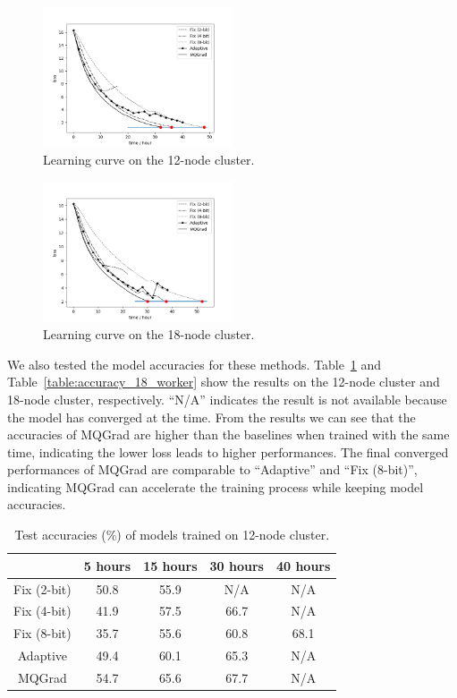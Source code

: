 \documentclass[sigconf]{acmart}
\begin{document}
\begin{figure}[t]
	\includegraphics[width=0.5\textwidth]{figure/loss_12.png}
	\caption{Learning curve on the 12-node cluster.}\label{fig:12_worker}
\end{figure}
\begin{figure}[t]
	\includegraphics[width=0.5\textwidth]{figure/loss_18.png}
	\caption{Learning curve on the 18-node cluster.}\label{fig:18_worker}
\end{figure}

We also tested the model accuracies for these methods. Table~\ref{table:accuracy_12_worker} and Table~\ref{table:accuracy_18_worker} show the results on the 12-node cluster and 18-node cluster, respectively. ``N/A'' indicates the result is not available because the model has converged at the time. From the results we can see that the accuracies of MQGrad are higher than the baselines when trained with the same time, indicating the lower loss leads to higher performances. The final converged performances of MQGrad are comparable to ``Adaptive'' and ``Fix (8-bit)'', indicating MQGrad can accelerate the training process while keeping model accuracies.

\begin{table}[t!]
	\caption{Test accuracies (\%) of models trained on 12-node cluster.} \label{table:accuracy_12_worker}
	\centering
	\footnotesize
	\begin{tabular}{c|cccc}
		\hline
		\diagbox{method}{time}   & 5 hours & 15 hours & 30 hours & 40 hours \\
		\hline\hline Fix (2-bit) & 50.8    & 55.9     & N/A      & N/A      \\
		Fix (4-bit)              & 41.9    & 57.5     & 66.7     & N/A      \\
		Fix (8-bit)              & 35.7    & 55.6     & 60.8     & 68.1     \\
		Adaptive                 & 49.4    & 60.1     & 65.3     & N/A      \\
		MQGrad                   & 54.7    & 65.6     & 67.7     & N/A      \\
		\hline
	\end{tabular}
\end{table}
\end{document}
